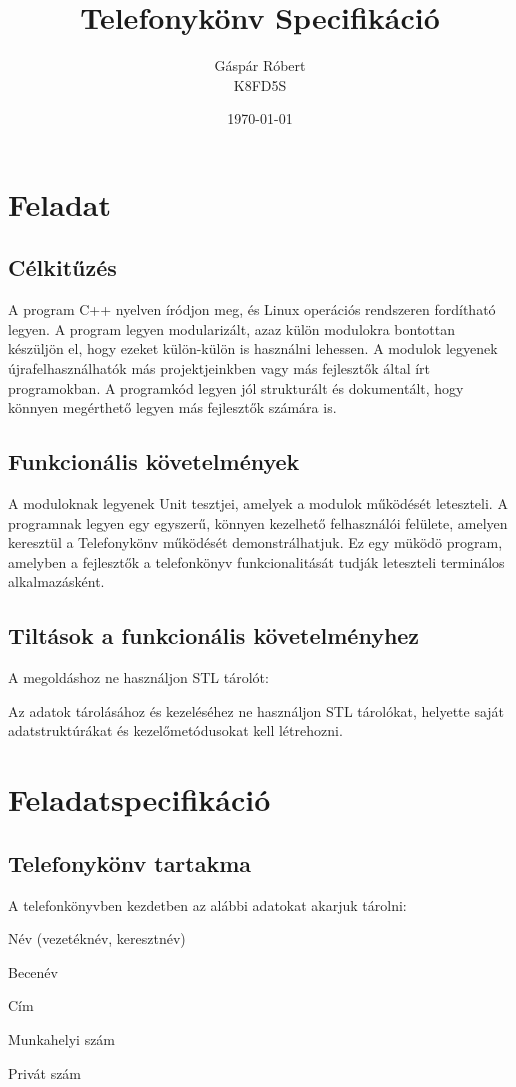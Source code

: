 \documentclass[11pt, letterpaper, openany, oneside]{book}
\title{\textbf{Telefonykönv Specifikáció}}
\author{\LARGE Gáspár Róbert \vspace{4px} \\ K8FD5S}
\date{\today}
\begin{document}
\maketitle

\tableofcontents

\chapter{Feladat}

\section{Célkitűzés}

A program C++ nyelven íródjon meg, és Linux operációs rendszeren fordítható legyen. A program legyen modularizált, azaz külön modulokra bontottan készüljön el, hogy ezeket külön-külön is használni lehessen. A modulok legyenek újrafelhasználhatók más projektjeinkben vagy más fejlesztők által írt programokban. A programkód legyen jól strukturált és dokumentált, hogy könnyen megérthető legyen más fejlesztők számára is.

\section{Funkcionális követelmények}

A moduloknak legyenek Unit tesztjei, amelyek a modulok működését leteszteli. A programnak legyen egy egyszerű, könnyen kezelhető felhasználói felülete, amelyen keresztül a Telefonykönv működését demonstrálhatjuk. Ez egy müködö program, amelyben a fejlesztők a telefonkönyv funkcionalitását tudják leteszteli terminálos alkalmazásként.

\section{Tiltások a funkcionális követelményhez}
A megoldáshoz ne használjon STL tárolót:

Az adatok tárolásához és kezeléséhez ne használjon STL tárolókat, helyette saját adatstruktúrákat és kezelőmetódusokat kell létrehozni.

\chapter{Feladatspecifikáció}

\section{Telefonykönv tartakma}
A telefonkönyvben kezdetben az alábbi adatokat akarjuk tárolni:
\vspace{5px}
\begin{compactitem}
    \item Név (vezetéknév, keresztnév)
    \item Becenév
    \item Cím
    \item Munkahelyi szám
    \item Privát szám
\end{compactitem}
\end{document}
